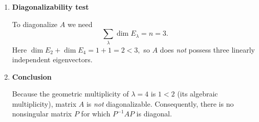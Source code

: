 \documentclass{report}
\begin{document}
{\begin{enumerate}[label=(\alph*)]
              \smallskip
              \[
                  \begin{aligned}
                      \lambda=2:\; &
                      (A-2I)\mathbf{x}=0
                      \;\Longrightarrow\;
                      \mathbf{x}=t\begin{bmatrix}1\\-2\\4\end{bmatrix},
                      \;\text{so }E_{2}=\operatorname{span}\!\left\{\begin{bmatrix}1\\-2\\4\end{bmatrix}\right\},\;
                      \dim E_{2}=1.  \\[6pt]
                      \lambda=4:\; &
                      (A-4I)\mathbf{x}=0
                      \;\Longrightarrow\;
                      \mathbf{x}=s\begin{bmatrix}0\\0\\1\end{bmatrix},
                      \;\text{so }E_{4}=\operatorname{span}\!\left\{\begin{bmatrix}0\\0\\1\end{bmatrix}\right\},\;
                      \dim E_{4}=1.
                  \end{aligned}
              \]

        \item \textbf{Diagonalizability test}

              To diagonalize \(A\) we need
              \[
                  \sum_{\lambda}\dim E_{\lambda}=n=3.
              \]
              Here \( \dim E_{2}+\dim E_{4}=1+1=2<3, \) so \(A\) does \emph{not} possess
              three linearly independent eigenvectors.

        \item \textbf{Conclusion}

              Because the geometric multiplicity of \(\lambda=4\) is \(1<2\) (its algebraic
              multiplicity), matrix \(A\) is \emph{not} diagonalizable. Consequently, there
              is no nonsingular matrix \(P\) for which \(P^{-1}AP\) is diagonal.
    \end{enumerate}
}

\end{document}

